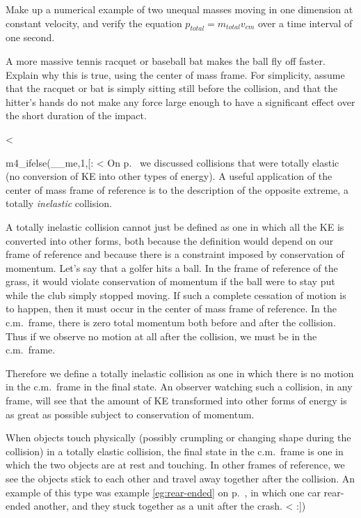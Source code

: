 \startdqs

\begin{dq}
Make up a numerical example of two unequal masses moving
in one dimension at constant velocity, and verify the
equation $p_{total}=m_{total}v_{cm}$ over a time
interval of one second.
\end{dq}

\begin{dq}
A more massive tennis racquet or baseball bat makes the
ball fly off faster. Explain why this is true, using the
center of mass frame. For simplicity, assume that the
racquet or bat is simply sitting still before the collision,
and that the hitter's hands do not make any force large
enough to have a significant effect over the short
duration of the impact.
\end{dq}

<%

m4_ifelse(__me,1,[:
<%
On p.~\pageref{elastic-and-inelastic} we discussed collisions that were totally elastic (no
conversion of KE into other types of energy). A useful application of the
center of mass frame of reference is to the description of the opposite extreme,
a totally \emph{inelastic} collision.

A totally inelastic collision cannot just be defined
as one in which all the KE is converted into other forms, both because the definition
would depend on our frame of reference and because
there is a constraint imposed by conservation of momentum. Let's say that
a golfer hits a ball. In the frame of reference of the grass,
it would violate conservation of momentum if
the ball were to stay put while the club simply stopped moving. If such a complete
cessation of motion is to happen, then it must occur in the center of mass frame
of reference. In the c.m.~frame, there is zero total momentum both before and after
the collision. Thus if we observe no motion at all after the collision, we must be in the
c.m.~frame. 

Therefore we define a totally inelastic collision as one in which there is no
motion in the c.m.~frame in the final state.
An observer watching such a collision, in any frame, will see that
the amount of KE transformed into other forms of energy is
as great as possible subject to conservation of momentum.

When objects touch physically (possibly crumpling or changing shape during
the collision) in a totally elastic collision, the final state in the c.m.~frame
is one in which the two objects are at rest and touching. In other frames of reference,
we see the objects stick to each other and travel away together after the collision.
An example of this type was example \ref{eg:rear-ended}
on p.~\pageref{eg:rear-ended}, in which one car rear-ended another, and they stuck
together as a unit after the crash.
<%
:])

